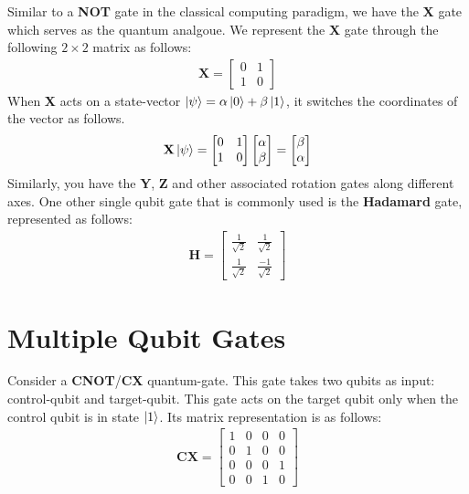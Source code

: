 Similar to a \textbf{NOT} gate in the classical computing paradigm, we have the \textbf{X} gate which serves as the quantum analgoue. We represent the \textbf{X} gate 
through the following $2\times2$ matrix as follows:
\begin{align}
    \mathbf{X} = \begin{bmatrix}
        0 & 1\\
        1 & 0
        \end{bmatrix}
\end{align}
When \textbf{X} acts on a state-vector $\ket{\psi} = \alpha\ket{0} + \beta\ket{1}$, it switches the coordinates of the vector as follows.
\begin{align}
    \mathbf{X}\ket{\psi} = \begin{bmatrix}
        0 & 1\\
        1 & 0
        \end{bmatrix}
        \begin{bmatrix}
            \alpha\\
            \beta
        \end{bmatrix} = \begin{bmatrix}
            \beta \\
            \alpha
        \end{bmatrix}
\end{align}
Similarly, you have the \textbf{Y}, \textbf{Z} and other associated rotation gates along different axes. One other single qubit gate that is commonly used is 
the \textbf{Hadamard} gate, represented as follows:
\begin{align}
    \mathbf{H} = \begin{bmatrix}
        \frac{1}{\sqrt{2}} & \frac{1}{\sqrt{2}}\\
        \frac{1}{\sqrt{2}} & \frac{-1}{\sqrt{2}}
        \end{bmatrix}
\end{align}

\section{Multiple Qubit Gates}

Consider a \textbf{CNOT}/\textbf{CX} quantum-gate. This gate takes two qubits as input: control-qubit and target-qubit. This gate acts on the target qubit 
only when the control qubit is in state $\ket{1}$. Its matrix representation is as follows:
\begin{align}
    \mathbf{CX} = \begin{bmatrix}
        1 & 0 & 0 & 0\\
        0 & 1 & 0 & 0\\
        0 & 0 & 0 & 1\\
        0 & 0 & 1 & 0
        \end{bmatrix}
\end{align}

